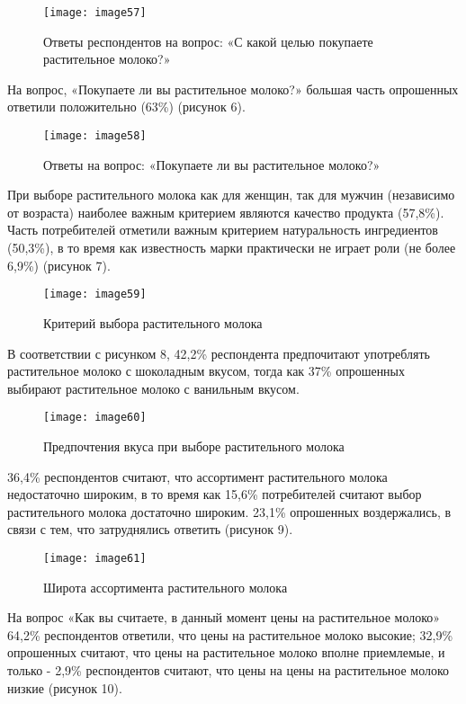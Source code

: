 \begin{figure}[H]
\centering
\texttt{[image: image57]}
\caption{Ответы респондентов на вопрос: «С какой целью покупаете растительное молоко?»}
\end{figure}

На вопрос, «Покупаете ли вы растительное молоко?» большая часть
опрошенных ответили положительно (63\%) (рисунок 6).

\begin{figure}[H]
\centering
\texttt{[image: image58]}
\caption{Ответы на вопрос: «Покупаете ли вы растительное молоко?»}
\end{figure}

При выборе растительного молока как для женщин, так для мужчин
(независимо от возраста) наиболее важным критерием являются качество
продукта (57,8\%). Часть потребителей отметили важным критерием
натуральность ингредиентов (50,3\%), в то время как известность марки
практически не играет роли (не более 6,9\%) (рисунок 7).

\begin{figure}[H]
\centering
\texttt{[image: image59]}
\caption{Критерий выбора растительного молока}
\end{figure}

В соответствии с рисунком 8, 42,2\% респондента предпочитают употреблять
растительное молоко с шоколадным вкусом, тогда как 37\% опрошенных
выбирают растительное молоко с ванильным вкусом.

\begin{figure}[H]
\centering
\texttt{[image: image60]}
\caption{Предпочтения вкуса при выборе растительного молока}
\end{figure}

36,4\% респондентов считают, что ассортимент растительного молока
недостаточно широким, в то время как 15,6\% потребителей считают выбор
растительного молока достаточно широким. 23,1\% опрошенных воздержались,
в связи с тем, что затруднялись ответить (рисунок 9).

\begin{figure}[H]
\centering
\texttt{[image: image61]}
\caption{Широта ассортимента растительного молока}
\end{figure}

На вопрос «Как вы считаете, в данный момент цены на растительное молоко»
64,2\% респондентов ответили, что цены на растительное молоко высокие;
32,9\% опрошенных считают, что цены на растительное молоко вполне
приемлемые, и только - 2,9\% респондентов считают, что цены на цены на
растительное молоко низкие (рисунок 10).


